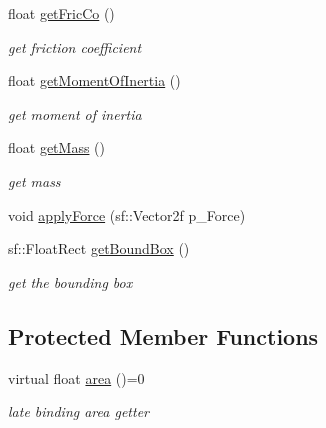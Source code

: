 \begin{DoxyCompactItemize}
\item 
\mbox{\label{class_dynamic_object_a0c6789df96b1d9007fbc27aa67303408}} 
float \hyperlink{class_dynamic_object_a0c6789df96b1d9007fbc27aa67303408}{get\+Fric\+Co} ()
\begin{DoxyCompactList}\small\item\em get friction coefficient \end{DoxyCompactList}\item 
\mbox{\label{class_dynamic_object_a63350c6fb11deb4ddd568f589fa08b24}} 
float \hyperlink{class_dynamic_object_a63350c6fb11deb4ddd568f589fa08b24}{get\+Moment\+Of\+Inertia} ()
\begin{DoxyCompactList}\small\item\em get moment of inertia \end{DoxyCompactList}\item 
\mbox{\label{class_dynamic_object_a55b099784c09e8a8dbd8272af92a102d}} 
float \hyperlink{class_dynamic_object_a55b099784c09e8a8dbd8272af92a102d}{get\+Mass} ()
\begin{DoxyCompactList}\small\item\em get mass \end{DoxyCompactList}\item 
void \hyperlink{class_dynamic_object_a33c22fe97d62f79152c508c03ada948c}{apply\+Force} (sf\+::\+Vector2f p\+\_\+\+Force)
\item 
\mbox{\label{class_dynamic_object_ae8948f5724a243df793332b0c8442b0d}} 
sf\+::\+Float\+Rect \hyperlink{class_dynamic_object_ae8948f5724a243df793332b0c8442b0d}{get\+Bound\+Box} ()
\begin{DoxyCompactList}\small\item\em get the bounding box \end{DoxyCompactList}\end{DoxyCompactItemize}
\subsection*{Protected Member Functions}
\begin{DoxyCompactItemize}
\item 
\mbox{\label{class_dynamic_object_a1169a5a6cf16738f27a83b2cddcc72f9}} 
virtual float \hyperlink{class_dynamic_object_a1169a5a6cf16738f27a83b2cddcc72f9}{area} ()=0
\begin{DoxyCompactList}\small\item\em late binding area getter \end{DoxyCompactList}\end{DoxyCompactItemize}
